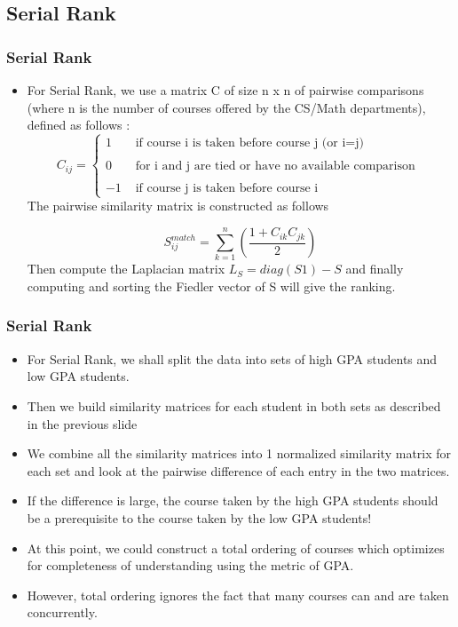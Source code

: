 \documentclass{beamer}
\begin{document}
\subsection{Serial Rank}
\begin{frame}
     \frametitle{Serial Rank}
\begin{itemize}
\item For Serial Rank, we use a matrix C of size n x n of pairwise comparisons (where n is the number of courses offered by the CS/Math departments), defined as follows :
\begin{equation}
C_{ij} = \left\{
	\begin{array}{rl}
 1 & \text{ if course i is taken before course j (or i=j)} 	\\
 &  \\
 0 & \text{ for i and j are tied or have no available comparison }	\\
 &  \\
 -1 & \text{ if course j is taken before course i} 
     \end{array}
   \right.
\label{myExpValue}
\end{equation}
The pairwise similarity matrix is constructed as follows

$$S_{ij}^{match} = \sum_{k=1}^{n}(\frac{1+C_{ik}C_{jk}}{2})$$
Then compute the Laplacian matrix $L_{S} = diag(S1) - S$ and finally computing and sorting the Fiedler vector of S will give the ranking. 

\end{itemize}
\end{frame} 

\begin{frame}
     \frametitle{Serial Rank}
\begin{itemize}
\item For Serial Rank, we shall split the data into sets of high GPA students and low GPA students.
\item Then we build similarity matrices for each student in both sets as described in the previous slide
\item We combine all the similarity matrices into 1 normalized similarity matrix for each set and look at the pairwise difference of each entry in the two matrices.
\item If the difference is large, the course taken by the high GPA students should be a prerequisite to the course taken by the low GPA students!
\item At this point, we could construct a total ordering of courses which optimizes for completeness of understanding using the metric of GPA.
\color{red}
\item However, \color{black} total ordering ignores the fact that many courses can and are taken concurrently.
\end{itemize}
\end{frame}
\end{document}
